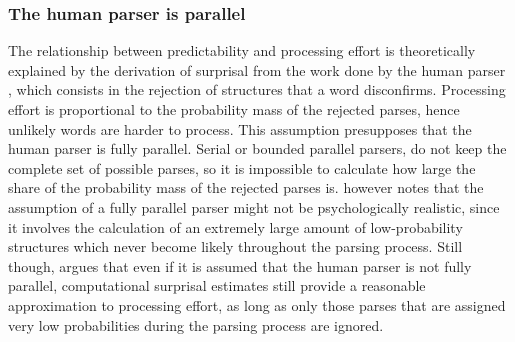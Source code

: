 \subsubsection{The human parser is parallel}
The relationship between predictability and processing effort is theoretically explained by the derivation of surprisal from the work done by the human parser \citep{hale2001, levy2008}, which consists in the rejection of structures that a word disconfirms. Processing effort is proportional to the probability mass of the rejected parses, hence unlikely words are harder to process. This assumption presupposes that the human parser is fully parallel. Serial or bounded parallel parsers, do not keep the complete set of possible parses, so it is impossible to calculate how large the share of the probability mass of the rejected parses is. \citet{levy2008} however notes that the assumption of a fully parallel parser might not be psychologically realistic, since it involves the calculation of an extremely large amount of low-probability structures which never become likely throughout the parsing process. Still though, \citet[1135--1136]{levy2008} argues that even if it is assumed that the human parser is not fully parallel, computational surprisal estimates still provide a reasonable approximation to processing effort, as long as only those parses that are assigned very low probabilities during the parsing process are ignored.

